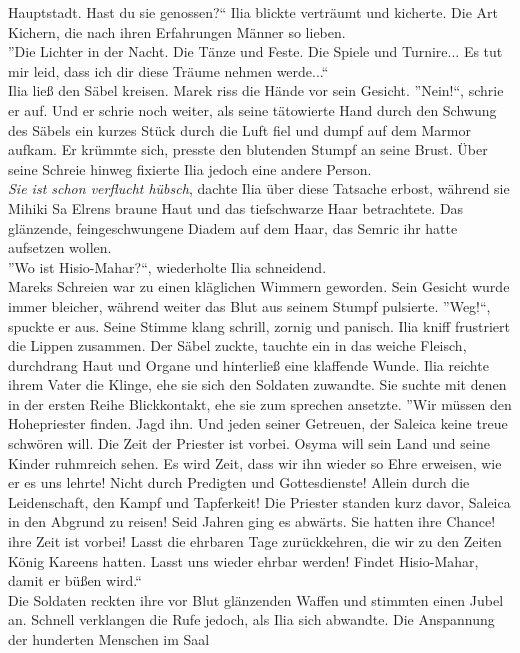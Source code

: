 Hauptstadt. Hast du sie genossen?`` Ilia blickte verträumt und kicherte. Die Art Kichern, die nach 
ihren Erfahrungen Männer so lieben.\\
''Die Lichter in der Nacht. Die Tänze und Feste. Die Spiele und Turnire... Es tut mir leid, dass 
ich dir diese Träume nehmen werde...``\\
Ilia ließ den Säbel kreisen. Marek riss die Hände vor sein Gesicht. ''Nein!``, schrie er auf. Und 
er schrie noch weiter, als seine tätowierte Hand durch den Schwung des Säbels ein kurzes Stück 
durch die Luft fiel und dumpf auf dem Marmor aufkam. Er krümmte sich, presste den blutenden Stumpf 
an seine Brust. Über seine Schreie hinweg fixierte Ilia jedoch eine andere Person.\\
\textit{Sie ist schon verflucht hübsch}, dachte Ilia über diese Tatsache erbost, während sie Mihiki 
Sa Elrens braune Haut und das tiefschwarze Haar betrachtete. Das glänzende, feingeschwungene Diadem 
auf dem Haar, das Semric ihr hatte aufsetzen wollen.\\
''Wo ist Hisio-Mahar?``, wiederholte Ilia schneidend.\\
Mareks Schreien war zu einen kläglichen Wimmern geworden. Sein Gesicht wurde immer bleicher, 
während weiter das Blut aus seinem Stumpf pulsierte. ''Weg!``, spuckte er aus. Seine Stimme klang 
schrill, zornig und panisch. Ilia kniff frustriert die Lippen zusammen. Der Säbel zuckte, tauchte 
ein in das weiche Fleisch, durchdrang Haut und Organe und hinterließ eine klaffende Wunde. Ilia 
reichte ihrem Vater die Klinge, ehe sie sich den Soldaten zuwandte. Sie suchte mit denen in der 
ersten Reihe Blickkontakt, ehe sie zum sprechen ansetzte. ''Wir müssen den Hohepriester finden. 
Jagd ihn. Und jeden seiner Getreuen, der Saleica keine treue schwören will. Die Zeit der Priester 
ist vorbei. Osyma will sein Land und seine Kinder ruhmreich sehen. Es wird Zeit, dass wir ihn 
wieder so Ehre erweisen, wie er es uns lehrte! Nicht durch Predigten und Gottesdienste! Allein 
durch die Leidenschaft, den Kampf und Tapferkeit! Die Priester standen kurz davor, Saleica in den 
Abgrund zu reisen! Seid Jahren ging es abwärts. Sie hatten ihre Chance! ihre Zeit ist vorbei! Lasst 
die ehrbaren Tage zurückkehren, die wir zu den Zeiten König Kareens hatten. Lasst uns wieder ehrbar 
werden! Findet Hisio-Mahar, damit er büßen wird.``\\
Die Soldaten reckten ihre vor Blut glänzenden Waffen und stimmten einen Jubel an. Schnell 
verklangen die Rufe jedoch, als Ilia sich abwandte. Die Anspannung der hunderten Menschen im Saal 

